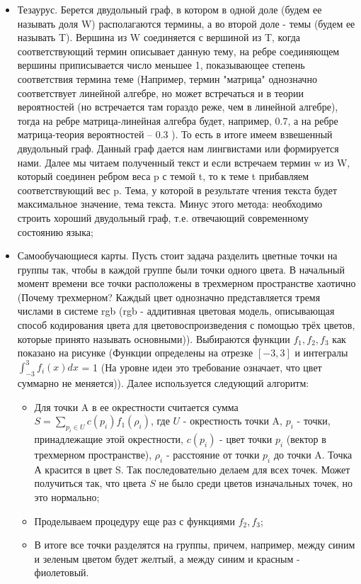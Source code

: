 \begin {itemize}
\item Тезаурус. Берется двудольный граф, в котором в одной доле (будем ее называть доля  W) располагаются термины, а во второй доле - темы (будем ее называть T). Вершина из W соединяется с вершиной из T, когда соответствующий термин описывает данную тему, на ребре соединяющем вершины приписывается число меньшее 1, показывающее степень соответствия термина теме (Например, термин "матрица" однозначно соответствует линейной алгебре, но может встречаться и в теории вероятностей (но встречается там гораздо реже, чем в линейной алгебре), тогда на ребре матрица-линейная алгебра будет, например, 0.7, а на ребре матрица-теория вероятностей -- 0.3 ). То есть в итоге имеем взвешенный двудольный граф. Данный граф дается нам лингвистами или формируется нами. Далее мы читаем полученный текст и если встречаем термин w из W, который соединен ребром веса p с темой t, то к теме t  прибавляем соответствующий вес p. Тема, у которой в результате чтения текста будет максимальное значение, тема текста. Минус этого метода: необходимо строить хороший двудольный граф, т.е. отвечающий современному состоянию языка;
\item Самообучающиеся карты.
Пусть стоит задача разделить цветные точки на группы так, чтобы в каждой группе были точки одного цвета. В начальный момент времени все точки расположены в трехмерном пространстве хаотично (Почему трехмерном? Каждый цвет однозначно представляется тремя числами в системе rgb (rgb - аддитивная цветовая модель, описывающая способ кодирования цвета для цветовоспроизведения с помощью трёх цветов, которые принято называть основными)). Выбираются функции $f_1, f_2, f_3$ как показано на рисунке (Функции определены на отрезке $[-3, 3]$ и интегралы $\int_{-3}^3 f_i (x) dx$ = 1 (На уровне идеи это требование означает, что цвет суммарно не меняется)).
Далее используется следующий алгоритм:
\begin {itemize}
\item Для точки A в ее окрестности считается сумма $S = \sum\limits_{p_i \in U} c (p_i) f_1 (\rho_i)$, где $U$ - окрестность точки A, $p_i$ - точки, принадлежащие этой окрестности, $c (p_i)$ - цвет точки $p_i$ (вектор в трехмерном пространстве), $\rho_i$ - расстояние от точки $p_i$ до точки A. Точка А красится в цвет S. Так последовательно делаем для всех точек. Может получиться так, что цвета $S$ не было среди цветов изначальных точек, но это нормально;
\item Проделываем процедуру еще раз с функциями $f_2, f_3$;
\item В итоге все точки разделятся на группы, причем, например, между синим и зеленым цветом будет желтый, а между синим и красным - фиолетовый.
\end {itemize}


\end{itemize}
